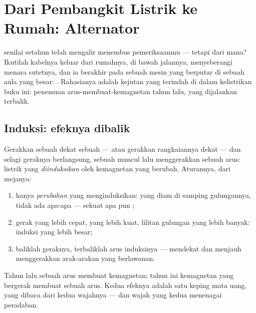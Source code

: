 \chapter{Dari Pembangkit Listrik ke Rumah: Alternator}\label{ch:g9:alternator}

 senilai setahun telah mengalir menembus pemeriksaanmu ---
tetapi dari mana? Ikutilah kabelnya keluar dari rumahnya, di bawah
jalannya, menyeberangi menara sutetnya, dan ia berakhir pada sebuah
mesin yang berputar di sebuah aula yang besar: .
Rahasianya adalah kejutan yang terindah di dalam kelistrikan buku ini:
penemuan arus-membuat-kemagnetan tahun lalu, yang dijalankan terbalik.

\section{Induksi: efeknya dibalik}

\begin{proposition}\label{prop:g9:alternator:induction}
Gerakkan sebuah  dekat sebuah  --- atau
gerakkan rangkaiannya dekat  --- dan selagi geraknya
berlangsung, sebuah  muncul lalu menggerakkan sebuah arus:
listrik yang \emph{diinduksikan} oleh kemagnetan yang berubah.
Aturannya, dari mejanya:
\begin{enumerate}
  \item hanya \emph{perubahan} yang menginduksikan:  yang diam
        di samping gulungannya, tidak ada apa-apa --- sekuat apa pun
        ;
  \item gerak yang lebih cepat,  yang lebih kuat, lilitan
        gulungan yang lebih banyak:  induksi yang lebih besar;
  \item baliklah geraknya, terbaliklah arus induksinya --- mendekat
        dan menjauh menggerakkan arak-arakan yang berlawanan.
\end{enumerate}
Tahun lalu sebuah arus membuat kemagnetan; tahun ini kemagnetan yang
bergerak membuat sebuah arus. Kedua efeknya adalah satu keping mata
uang, yang dibaca dari kedua wajahnya --- dan wajah yang kedua
menenagai peradaban.
\end{proposition}

